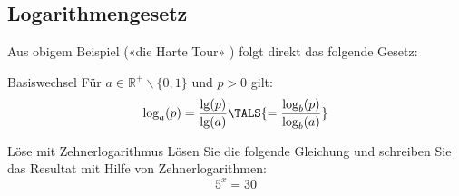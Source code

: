  \subsection{Logarithmengesetz}
Aus obigem Beispiel («die Harte Tour» ) folgt direkt das folgende Gesetz:

\begin{gesetz}{Basiswechsel}{}
  Für $a\in\mathbb{R}^{+}\backslash\{0,1\}$ und $p>0$ gilt:
  $$\log_a(p) = \frac{\lg(p)}{\lg(a)}\TALS{ = \frac{\log_b(p)}{\log_b(a)}}$$
\end{gesetz}





\begin{beispiel}{Löse mit Zehnerlogarithmus}{}
  Lösen Sie die folgende Gleichung und schreiben Sie das Resultat mit
  Hilfe von Zehnerlogarithmen:
  $$5^x = 30$$
\end{beispiel}


%

\newpage


